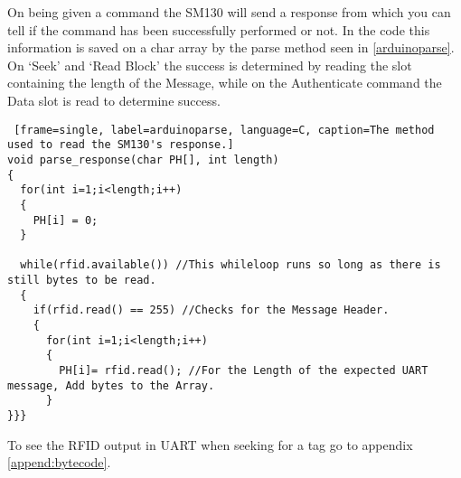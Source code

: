 On being given a command the SM130 will send a response from which you can tell if the command has been successfully performed or not.
In the code this information is saved on a char array by the parse method seen in \autoref{arduinoparse}. 
On `Seek' and `Read Block' the success is determined by reading the slot containing the length of the Message, while on the Authenticate command the Data slot is read to determine success.

\begin{lstlisting} [frame=single, label=arduinoparse, language=C, caption=The method used to read the SM130's response.]
void parse_response(char PH[], int length)
{
  for(int i=1;i<length;i++)
  {
    PH[i] = 0;
  }
  
  while(rfid.available()) //This whileloop runs so long as there is still bytes to be read. 
  {
    if(rfid.read() == 255) //Checks for the Message Header.
    {
      for(int i=1;i<length;i++)
      {
        PH[i]= rfid.read(); //For the Length of the expected UART message, Add bytes to the Array.
      }
}}}												
\end{lstlisting}
To see the RFID output in UART when seeking for a tag go to appendix \vref{append:bytecode}.
